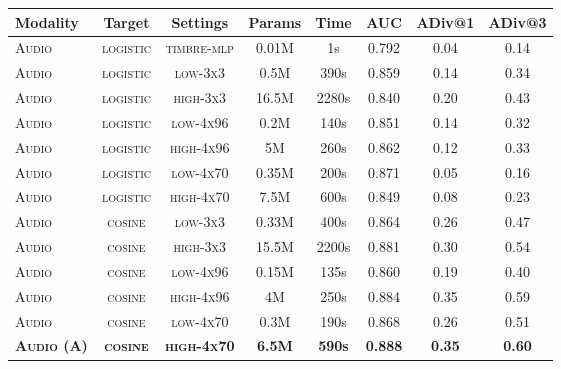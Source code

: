 \begin{table}[ht]
\label{tbl:results}
\centering
\scriptsize
\begin{tabular}{lccccccc}
Modality & Target & Settings                & Params         & Time    & AUC        & ADiv@1           & ADiv@3           \\
\toprule
\textsc{Audio} & \textsc{logistic} & \textsc{timbre-mlp}                   &  0.01M              & 1s              & 0.792               & 0.04             & 0.14             \\
\textsc{Audio} & \textsc{logistic} & \textsc{low-3x3}           & 0.5M           & 390s          & 0.859          & 0.14          & 0.34         \\
\textsc{Audio} & \textsc{logistic} & \textsc{high-3x3}          & 16.5M          & 2280s         & 0.840          & 0.20          & 0.43         \\
\textsc{Audio} & \textsc{logistic} & \textsc{low-4x96}          & 0.2M           & 140s          & 0.851          & 0.14          & 0.32         \\
\textsc{Audio} & \textsc{logistic} & \textsc{high-4x96}         & 5M             & 260s          & 0.862          & 0.12          & 0.33         \\
\textsc{Audio} & \textsc{logistic} & \textsc{low-4x70} & 0.35M & 200s & 0.871 & 0.05 & 0.16 \\
\textsc{Audio} & \textsc{logistic} & \textsc{high-4x70}         & 7.5M           & 600s          & 0.849          & 0.08          & 0.23         \\
\textsc{Audio} & \textsc{cosine} & \textsc{low-3x3}            & 0.33M          & 400s          & 0.864          & 0.26          & 0.47        \\
\textsc{Audio} & \textsc{cosine} & \textsc{high-3x3}           & 15.5M          & 2200s         & 0.881          & 0.30          & 0.54        \\
\textsc{Audio} & \textsc{cosine} & \textsc{low-4x96}           & 0.15M          & 135s          & 0.860          & 0.19          & 0.40        \\
\textsc{Audio} & \textsc{cosine} & \textsc{high-4x96}          & 4M             & 250s          & 0.884          & 0.35          & 0.59         \\
\textsc{Audio} & \textsc{cosine} & \textsc{low-4x70}           & 0.3M           & 190s          & 0.868          & 0.26          & 0.51       \\
\textbf{\textsc{Audio (A)}} & \textbf{\textsc{cosine}} & \textbf{\textsc{high-4x70}} & \textbf{6.5M}  & \textbf{590s} & \textbf{0.888} & \textbf{0.35} & \textbf{0.60} \\

\end{tabular}
\end{table}
